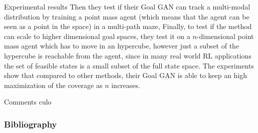 \documentclass{beamer}
\begin{document}
	
	\begin{frame}{Experimental results}
		Then they test if their Goal GAN can track a multi-modal distribution by training a point mass agent (which means that the agent can be seen as a point in the space) in a multi-path maze, 
		Finally, to test if the method can scale to higher dimensional goal spaces, they test it on a $n$-dimensional point mass agent which has to move in an hypercube, however just a subset of the hypercube is reachable from the agent, since in many real world RL applications the set of feasible states is a small subset of the full state space. The experiments show that compared to other methods, their Goal GAN is able to keep an high maximization of the coverage as $n$ increases. 
	\end{frame}


	\begin{frame}{Comments}
		culo
	\end{frame}
	
	
	\begin{frame}
		\frametitle{Bibliography}
		\footnotesize
		\nocite{florensa2018automatic}
		\nocite{mao2017least}
		\nocite{duan2016benchmarking}
		
		
	\end{frame}
	
	
\end{document}
